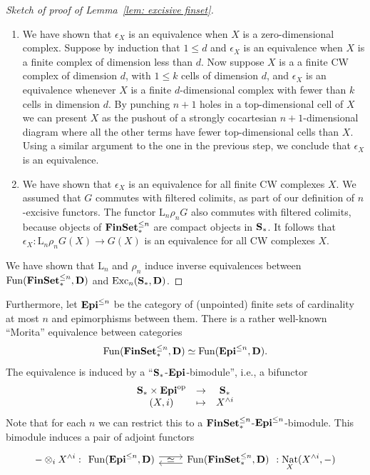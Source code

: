 \documentclass[psamsfonts]{amsart}
\theoremstyle{plain}
\theoremstyle{definition}
\theoremstyle{remark}
\newcommand{\catname}[1]{{\normalfont\textbf{#1}}}
\newcommand{\op}{{\mathrm{op}}}
\newcommand{\finset}{\catname{FinSet}_*}
\newcommand{\epi}{\catname{Epi}}
\newcommand{\spaces}{\catname{S}_*}
\newcommand{\lkan}{\mathrm{L}}
\DeclareMathOperator{\nat}{Nat}
\DeclareMathOperator{\fun}{Fun}
\DeclareMathOperator{\exc}{Exc}
\begin{document}
\begin{proof}[Sketch of proof of Lemma~\ref{lem: excisive finset}]
\begin{enumerate}
\item We have shown that $\epsilon_X$ is an equivalence when $X$ is a zero-dimensional complex. Suppose by induction that $1\le d$ and $\epsilon_X$ is an equivalence when $X$ is a finite complex of dimension less than $d$. Now suppose $X$ is a a finite CW complex of dimension $d$, with $1\le k$ cells  of dimension $d$, and $\epsilon_X$ is an equivalence whenever $X$ is a finite $d$-dimensional complex with fewer than $k$ cells in dimension $d$. By punching $n+1$ holes in a top-dimensional cell of $X$ we can present $X$ as the pushout of a strongly cocartesian $n+1$-dimensional diagram where all the other terms have fewer top-dimensional cells than $X$. Using a similar argument to the one in the previous step, we conclude that $\epsilon_X$ is an equivalence. 
\item We have shown that $\epsilon_X$ is an equivalence for all finite CW complexes $X$. We assumed that $G$ commutes with filtered colimits, as part of our definition of $n$-excisive functors. The functor $\lkan_n\rho_n G$ also commutes with filtered colimits, because objects of $\finset^{\le n}$ are compact objects in $\spaces$. It follows that $\epsilon_X\colon \lkan_n\rho_n G(X)\to G(X)$ is an equivalence for all CW complexes $X$. 
\end{enumerate}
We have shown that $\lkan_n$ and $\rho_n$ induce inverse equivalences between $\fun(\finset^{\le n}, \catname{D})$ and $\exc_n(\spaces, \catname{D})$.
\end{proof}
Furthermore, let $\epi^{\le n}$ be the category of (unpointed) finite sets of cardinality at most $n$ and epimorphisms between them. There is a rather well-known ``Morita'' equivalence between categories
\[
\fun(\finset^{\le n}, \catname{D})\simeq \fun(\epi^{\le n}, \catname{D}).
\]
The equivalence is induced by a ``$\spaces$-$\epi$-bimodule'', i.e., a bifunctor
\[
\begin{array}{ccc}
\spaces\times \epi^{\op} & \to & \spaces\\
(X, i) & \mapsto &  X^{\wedge i}
\end{array}
\]
Note that for each $n$ we can restrict this to a $\finset^{\le n}$-$\epi^{\le n}$-bimodule. This bimodule induces a pair of adjoint functors
\[
-\otimes_{i} X^{\wedge i} : \begin{tikzcd}
           \fun(\epi^{\le n}, \catname{D})
           \arrow[r, shift left=.75ex]
            \arrow[r, phantom, "\simeq"] 
           &  \fun(\finset^{\le n}, \catname{D})
           \arrow[l, shift left=.75ex]      
        \end{tikzcd}  : \nat_X(X^{\wedge i}, -)
\]
\end{document}
